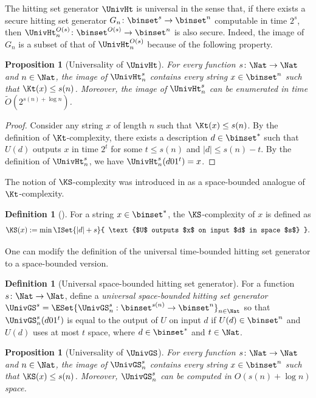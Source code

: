 \documentclass[11pt]{article}
\numberwithin{equation}{section}
\newtheorem{proposition}[theorem]{Proposition}
\theoremstyle{definition}
\newtheorem{definition}[theorem]{Definition}
\theoremstyle{plain}
\begin{document}
The hitting set generator $\UnivHt$ is universal in the sense that, if there exists a secure hitting set generator $G_n \colon \binset^{s} \to \binset^n$ computable in time $2^s$,
then
$\UnivHt^{O(s)}_n \colon \binset^{O(s)} \to \binset^n$ is also secure.
Indeed, the image of $G_n$ is a subset of that of $\UnivHt^{O(s)}_n$ because
of the following property.
\begin{proposition}
  [Universality of $\UnivHt$]
  \label{prop_UniversalHSGforTime}
  For every function $s \colon \Nat \to \Nat$ and $n \in \Nat$,
  the image of $\UnivHt^s_n$ contains every string $x \in \binset^n$ such that $\Kt(x) \le s(n)$.
  Moreover, the image of $\UnivHt^s_n$ can be enumerated in time $\widetilde O(2^{s(n) + \log n})$.
\end{proposition}
\begin{proof}
  Consider any string $x$ of length $n$ such that $\Kt(x) \le s(n)$.
  By the definition of $\Kt$-complexity,
  there exists a description $d \in \binset^*$ such that
  $U(d)$ outputs $x$ in time $2^t$ for some $t \le s(n)$ and $|d| \le s(n) - t$.
  By the definition of $\UnivHt^s_n$, we have
  $\UnivHt^s_n(d 0 1^t) = x$.
\end{proof}


The notion of $\KS$-complexity was introduced in \cite{AllenderBKMR06_siamcomp_journals}
as a space-bounded analogue of $\Kt$-complexity.
\begin{definition}
  [\cite{AllenderBKMR06_siamcomp_journals}]
  For a string $x \in \binset^*$, the $\KS$-complexity of $x$ is defined as
  $$
    \KS(x) := \min \ISet { |d| + s } { \text{$U$ outputs $x$ on input $d$ in space $s$} }.
  $$
\end{definition}
One can modify the definition of the universal time-bounded hitting set generator
to a space-bounded version.
\begin{definition}
  [Universal space-bounded hitting set generator]
  For a function $s \colon \Nat \to \Nat$,
  define
  a \emph{universal space-bounded hitting set generator}
  $\UnivGS^s = \ESet{ \UnivGS^s_n : \binset^{s(n)} \to \binset^n }_{n \in \Nat}$
  so that
  $\UnivGS^s_n(d 0 1^t)$ is equal to
  the output of $U$ on input $d$ if
  $U(d) \in \binset^n$ and $U(d)$ uses at most $t$ space,
  where $d \in \binset^*$ and $t \in \Nat$.
\end{definition}
\begin{proposition}
  [Universality of $\UnivGS$]
  \label{prop_UniversalHSGforSpace}
  For every function $s \colon \Nat \to \Nat$ and $n \in \Nat$,
  the image of $\UnivGS^s_n$ contains every string $x \in \binset^n$ such that $\KS(x) \le s(n)$.
  Moreover, $\UnivGS^s_n$ can be computed in $O(s(n) + \log n)$ space.
\end{proposition}
\end{document}
